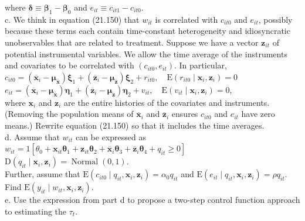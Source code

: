 \documentclass[10pt]{article}
\begin{document}
where $\boldsymbol{\delta} \equiv \boldsymbol{\beta}_{1}-\boldsymbol{\beta}_{0}$ and $e_{i t} \equiv c_{i t 1}-c_{i t 0}$.\\
c. We think in equation (21.150) that $w_{i t}$ is correlated with $c_{i t 0}$ and $e_{i t}$, possibly because these terms each contain time-constant heterogeneity and idiosyncratic unobservables that are related to treatment. Suppose we have a vector $\mathbf{z}_{i t}$ of potential instrumental variables. We allow the time average of the instruments and covariates to be correlated with $\left(c_{i t 0}, e_{i t}\right)$. In particular,\\
$c_{i t 0}=\left(\overline{\mathbf{x}}_{i}-\boldsymbol{\mu}_{\overline{\mathbf{x}}}\right) \boldsymbol{\xi}_{1}+\left(\overline{\mathbf{z}}_{i}-\boldsymbol{\mu}_{\overline{\mathbf{z}}}\right) \boldsymbol{\xi}_{2}+r_{i t 0}, \quad \mathrm{E}\left(r_{i t 0} \mid \mathbf{x}_{i}, \mathbf{z}_{i}\right)=0$\\
$e_{i t}=\left(\overline{\mathbf{x}}_{i}-\boldsymbol{\mu}_{\overline{\mathbf{x}}}\right) \boldsymbol{\eta}_{1}+\left(\overline{\mathbf{z}}_{i}-\boldsymbol{\mu}_{\overline{\mathbf{z}}}\right) \boldsymbol{\eta}_{2}+v_{i t}, \quad \mathrm{E}\left(v_{i t} \mid \mathbf{x}_{i}, \mathbf{z}_{i}\right)=0$,\\
where $\mathbf{x}_{i}$ and $\mathbf{z}_{i}$ are the entire histories of the covariates and instruments. (Removing the population means of $\overline{\mathbf{x}}_{i}$ and $\overline{\mathbf{z}}_{i}$ ensures $c_{i t 0}$ and $e_{i t}$ have zero means.) Rewrite equation (21.150) so that it includes the time averages.\\
d. Assume that $w_{i t}$ can be expressed as\\
$w_{i t}=1\left[\theta_{0}+\mathbf{x}_{i t} \boldsymbol{\theta}_{1}+\mathbf{z}_{i t} \boldsymbol{\theta}_{2}+\overline{\mathbf{x}}_{i} \boldsymbol{\theta}_{3}+\overline{\mathbf{z}}_{i} \boldsymbol{\theta}_{4}+q_{i t} \geq 0\right]$\\
$\mathrm{D}\left(q_{i t} \mid \mathbf{x}_{i}, \mathbf{z}_{i}\right)=\operatorname{Normal}(0,1)$.\\
Further, assume that $\mathrm{E}\left(c_{i t 0} \mid q_{i t}, \mathbf{x}_{i}, \mathbf{z}_{i}\right)=\alpha_{0} q_{i t}$ and $\mathrm{E}\left(e_{i t} \mid q_{i t}, \mathbf{x}_{i}, \mathbf{z}_{i}\right)=\rho q_{i t}$. Find $\mathrm{E}\left(y_{i t} \mid w_{i t}, \mathbf{x}_{i}, \mathbf{z}_{i}\right)$.\\
e. Use the expression from part d to propose a two-step control function approach to estimating the $\tau_{t}$.\\
\end{document}
